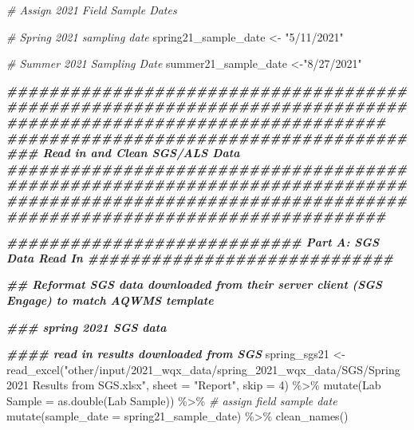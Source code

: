 \documentclass[
]{book}
\newenvironment{Shaded}{\begin{snugshade}}{\end{snugshade}}
\newcommand{\AttributeTok}[1]{\textcolor[rgb]{0.77,0.63,0.00}{#1}}
\newcommand{\CommentTok}[1]{\textcolor[rgb]{0.56,0.35,0.01}{\textit{#1}}}
\newcommand{\DecValTok}[1]{\textcolor[rgb]{0.00,0.00,0.81}{#1}}
\newcommand{\DocumentationTok}[1]{\textcolor[rgb]{0.56,0.35,0.01}{\textbf{\textit{#1}}}}
\newcommand{\FunctionTok}[1]{\textcolor[rgb]{0.00,0.00,0.00}{#1}}
\newcommand{\NormalTok}[1]{#1}
\newcommand{\OtherTok}[1]{\textcolor[rgb]{0.56,0.35,0.01}{#1}}
\newcommand{\SpecialCharTok}[1]{\textcolor[rgb]{0.00,0.00,0.00}{#1}}
\newcommand{\StringTok}[1]{\textcolor[rgb]{0.31,0.60,0.02}{#1}}
\begin{document}
\begin{Shaded}
\begin{Highlighting}[]
\CommentTok{\# Assign 2021 Field Sample Dates }

\CommentTok{\# Spring 2021 sampling date}
\NormalTok{spring21\_sample\_date }\OtherTok{\textless{}{-}} \StringTok{"5/11/2021"}

\CommentTok{\# Summer 2021 Sampling Date}
\NormalTok{summer21\_sample\_date }\OtherTok{\textless{}{-}}\StringTok{"8/27/2021"}

\DocumentationTok{\#\#\#\#\#\#\#\#\#\#\#\#\#\#\#\#\#\#\#\#\#\#\#\#\#\#\#\#\#\#\#\#\#\#\#\#\#\#\#\#\#\#\#\#\#\#\#\#\#\#\#\#\#\#\#\#\#\#\#\#\#\#\#\#\#\#\#\#\#\#\#\#\#\#\#\#\#\#\#\#\#\#\#\#\#\#\#\#\#\#\#\#\#\#\#\#\#\#\#\#\#\#\#\#\#\#\#\#\#\#\#\#}
\DocumentationTok{\#\#\#\#\#\#\#\#\#\#\#\#\#\#\#\#\#\#\#\#\#\#\#\#\#\#\#\#\#\#\#\#\#\#\#\#\#\#\#\#\# Read in  and Clean SGS/ALS Data \#\#\#\#\#\#\#\#\#\#\#\#\#\#\#\#\#\#\#\#\#\#\#\#\#\#\#\#\#\#\#\#\#\#\#\#\#\#}
\DocumentationTok{\#\#\#\#\#\#\#\#\#\#\#\#\#\#\#\#\#\#\#\#\#\#\#\#\#\#\#\#\#\#\#\#\#\#\#\#\#\#\#\#\#\#\#\#\#\#\#\#\#\#\#\#\#\#\#\#\#\#\#\#\#\#\#\#\#\#\#\#\#\#\#\#\#\#\#\#\#\#\#\#\#\#\#\#\#\#\#\#\#\#\#\#\#\#\#\#\#\#\#\#\#\#\#\#\#\#\#\#\#\#\#\#}


\DocumentationTok{\#\#\#\#\#\#\#\#\#\#\#\#\#\#\#\#\#\#\#\#\#\#\#\#\#\#\#\# Part A: SGS Data Read In \#\#\#\#\#\#\#\#\#\#\#\#\#\#\#\#\#\#\#\#\#\#\#\#\#\#\#\#\#}

\DocumentationTok{\#\# Reformat SGS data downloaded from their server client (SGS Engage) to match AQWMS template}

\DocumentationTok{\#\#\# spring 2021 SGS data}

\DocumentationTok{\#\#\#\# read in results downloaded from SGS }
\NormalTok{spring\_sgs21 }\OtherTok{\textless{}{-}} \FunctionTok{read\_excel}\NormalTok{(}\StringTok{"other/input/2021\_wqx\_data/spring\_2021\_wqx\_data/SGS/Spring 2021 Results from SGS.xlsx"}\NormalTok{, }\AttributeTok{sheet =} \StringTok{"Report"}\NormalTok{, }\AttributeTok{skip =} \DecValTok{4}\NormalTok{) }\SpecialCharTok{\%\textgreater{}\%}
  \FunctionTok{mutate}\NormalTok{(}\StringTok{\textasciigrave{}}\AttributeTok{Lab Sample}\StringTok{\textasciigrave{}} \OtherTok{=} \FunctionTok{as.double}\NormalTok{(}\StringTok{\textasciigrave{}}\AttributeTok{Lab Sample}\StringTok{\textasciigrave{}}\NormalTok{)) }\SpecialCharTok{\%\textgreater{}\%}
  \CommentTok{\# assign field sample date}
  \FunctionTok{mutate}\NormalTok{(}\AttributeTok{sample\_date =}\NormalTok{ spring21\_sample\_date) }\SpecialCharTok{\%\textgreater{}\%}
  \FunctionTok{clean\_names}\NormalTok{()}


\end{Highlighting}
\end{Shaded}
\end{document}
